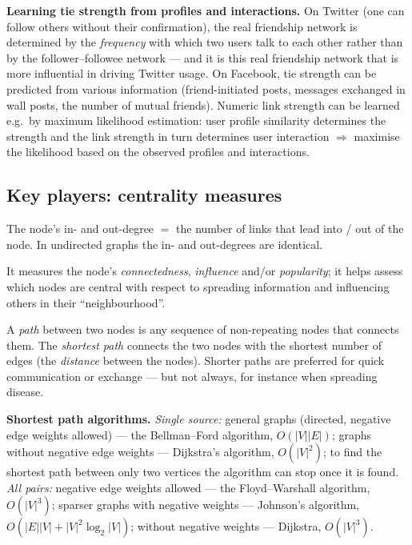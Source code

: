 \documentclass[11pt,a4paper]{article}
\theoremstyle{definition}
\providecommand{\uv}[1]{``#1''}
\begin{document}
\textbf{Learning tie strength from profiles and interactions.} On Twitter (one can follow others
without their confirmation), the real friendship network is determined by the \emph{frequency} with
which two users talk to each other rather than by the follower--followee network --- and it is this
real friendship network that is more influential in driving Twitter usage. On Facebook, tie strength
can be predicted from various information (friend-initiated posts, messages exchanged in wall posts,
the number of mutual friends). Numeric link strength can be learned e.g.\ by maximum likelihood
estimation: user profile similarity determines the strength and the link strength in turn determines
user interaction $\Rightarrow$ maximise the likelihood based on the observed profiles and
interactions.

\subsection{Key players: centrality measures}

\begin{defbox}
The node's in- and out-degree $=$ the number of links that lead into / out of the node. In undirected
graphs the in- and out-degrees are identical.

It measures the node's \emph{connectedness}, \emph{influence} and/or \emph{popularity}; it helps
assess which nodes are central with respect to spreading information and influencing others in their
\uv{neighbourhood}.
\end{defbox}

\begin{defbox}
A \emph{path} between two nodes is any sequence of non-repeating nodes that connects them. The
\emph{shortest path} connects the two nodes with the shortest number of edges (the \emph{distance}
between the nodes). Shorter paths are preferred for quick communication or exchange --- but not
always, for instance when spreading disease.

\textbf{Shortest path algorithms.} \emph{Single source:} general graphs (directed, negative edge
weights allowed) --- the Bellman--Ford algorithm, $O(|V||E|)$; graphs without negative edge weights
--- Dijkstra's algorithm, $O(|V|^2)$; to find the shortest path between only two vertices the
algorithm can stop once it is found. \emph{All pairs:} negative edge weights allowed --- the
Floyd--Warshall algorithm, $O(|V|^3)$; sparser graphs with negative weights --- Johnson's algorithm,
$O(|E||V|+|V|^2\log_2|V|)$; without negative weights --- Dijkstra, $O(|V|^3)$.
\end{defbox}
\end{document}
